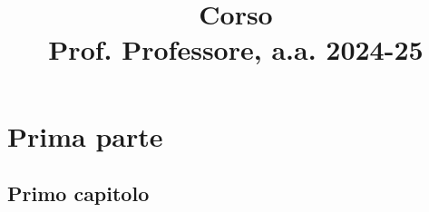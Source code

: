 \documentclass[a4paper, 12pt, openany]{book}
\title{\Huge\textbf{Corso} \\ \large Prof. Professore, a.a. 2024-25}
\begin{document}
\frontmatter

\maketitle
\tableofcontents

\mainmatter

\part{Prima parte}

\chapter{Primo capitolo}
\end{document}
